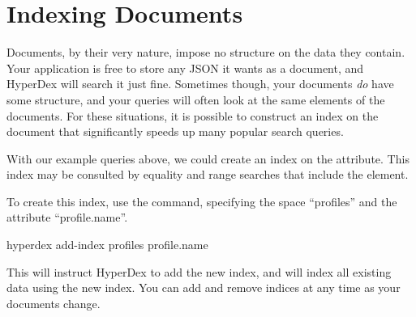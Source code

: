 \section{Indexing Documents}

Documents, by their very nature, impose no structure on the data they contain.
Your application is free to store any JSON it wants as a document, and HyperDex
will search it just fine.  Sometimes though, your documents {\em do} have some
structure, and your queries will often look at the same elements of the
documents.  For these situations, it is possible to construct an index on the
document that significantly speeds up many popular search queries.

With our example queries above, we could create an index on the
 attribute.  This index may be consulted by equality and
range searches that include the  element.

To create this index, use the  command, specifying the space
``profiles'' and the attribute ``profile.name''.

\begin{consolecode}
hyperdex add-index profiles profile.name
\end{consolecode}

This will instruct HyperDex to add the new index, and will index all existing
data using the new index.  You can add and remove indices at any time as your
documents change.
